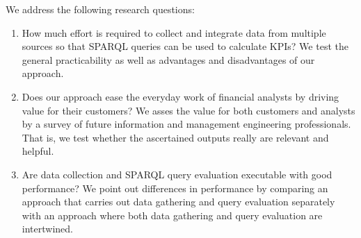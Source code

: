 \documentclass[runningheads]{llncs}
\begin{document}
We address the following research questions:
\begin{enumerate}
\item How much effort is required to collect and integrate data from multiple sources so that SPARQL queries can be used to calculate KPIs?
  We test the general practicability as well as advantages and disadvantages of our approach.
\item Does our approach ease the everyday work of financial analysts by driving value for their customers?
  We asses the value for both customers and analysts by a survey of future information and management engineering professionals.
  That is, we test whether the ascertained outputs really are relevant and helpful.
\item Are data collection and SPARQL query evaluation executable with good performance?
  We point out differences in performance by comparing an approach that carries out data gathering and query evaluation separately with an approach where both data gathering and query evaluation are intertwined.
\end{enumerate}


\end{document}
